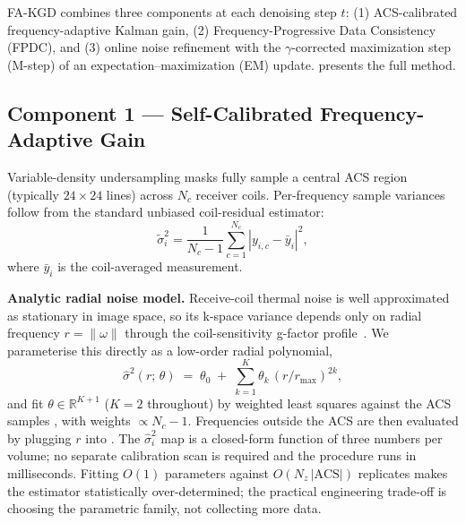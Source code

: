 \documentclass[conference]{IEEEtran}
\newcommand{\hatsig}{\hat{\sigma}}
\begin{document}
FA-KGD combines three components at each denoising step $t$:
(1) ACS-calibrated frequency-adaptive Kalman gain, (2) Frequency-Progressive
Data Consistency (FPDC), and (3) online noise refinement with the
$\gamma$-corrected maximization step (M-step) of an
expectation--maximization (EM) update.  presents the full
method.

\subsection{Component 1 — Self-Calibrated Frequency-Adaptive Gain}

Variable-density undersampling masks fully sample a central ACS region
(typically $24 \times 24$ lines) across $N_c$ receiver coils. Per-frequency
sample variances follow from the standard unbiased coil-residual estimator:
\begin{equation}
  \tilde{\sigma}_i^2 = \frac{1}{N_c - 1}
  \sum_{c=1}^{N_c} \left|y_{i,c} - \bar{y}_i\right|^2,
  \label{eq:acs}
\end{equation}
where $\bar{y}_i$ is the coil-averaged measurement.

\textbf{Analytic radial noise model.} Receive-coil thermal noise is well
approximated as stationary in image space, so its k-space variance depends
only on radial frequency $r=\|\omega\|$ through the coil-sensitivity
g-factor profile~\cite{uecker2014espirit}. We parameterise this directly
as a low-order radial polynomial,
\begin{equation}
  \hatsig^2(r;\,\theta) \;=\; \theta_0 \;+\; \sum_{k=1}^{K}
  \theta_k\,(r/r_{\max})^{2k},
  \label{eq:radial_model}
\end{equation}
and fit $\theta\!\in\!\mathbb{R}^{K+1}$ ($K{=}2$ throughout) by weighted
least squares against the ACS samples , with weights
$\propto N_c{-}1$. Frequencies outside the ACS are then evaluated by
plugging $r$ into . The $\hat\sigma_i^2$ map
is a closed-form function of three numbers per volume; no separate
calibration scan is required and the procedure runs in milliseconds.
Fitting $O(1)$ parameters against $O(N_z\,|\text{ACS}|)$ replicates makes
the estimator statistically over-determined; the practical engineering
trade-off is choosing the parametric family, not collecting more data.
\end{document}
